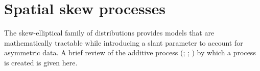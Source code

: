 \documentclass[useAMS,usenatbib,referee]{biom}
\begin{document}


\section{Spatial skew processes}\label{sts:spatialskew}
The skew-elliptical family of distributions provides models that are mathematically tractable while introducing a slant parameter to account for asymmetric data.
A brief review of the additive process (\citealp{Azzalini2003}; \citealp[p. 129]{Azzalini2014}; \citealp{Beranger2016}) by which a \skewt process is created is given here.
\end{document}
